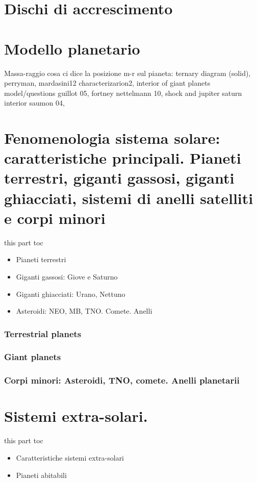 \documentclass[10pt,xcolor={usenames},fleqn,mathserif,serif]{beamer}
\begin{document}
\part{Dischi di accrescimento}


\part{Modello planetario}
\begin{frame}{Massa-raggio}
cosa ci dice la posizione m-r sul pianeta: ternary diagram (solid), perryman, mardasini12 characterizarion2, interior of giant planets model/questions guillot 05, fortney nettelmann 10, shock and jupiter saturn interior saumon 04, 
\end{frame}


\part{Fenomenologia sistema solare: caratteristiche principali. Pianeti terrestri, giganti gassosi, giganti ghiacciati, sistemi di anelli satelliti e corpi minori}

\begin{frame}{this part toc}
\begin{itemize}
\item Pianeti terrestri
\item Giganti gassosi: Giove e Saturno
\item Giganti ghiacciati: Urano, Nettuno
\item Asteroidi: NEO, MB, TNO. Comete. Anelli
\end{itemize}
\end{frame}

\section{Terrestrial planets}


\section{Giant planets}


\section{Corpi minori: Asteroidi, TNO, comete. Anelli planetarii}


\part{Sistemi extra-solari.}

\begin{frame}{this part toc}
\begin{itemize}
\item Caratteristiche sistemi extra-solari
\item Pianeti abitabili
\end{itemize}
\end{frame}



\clearpage

\end{document}
